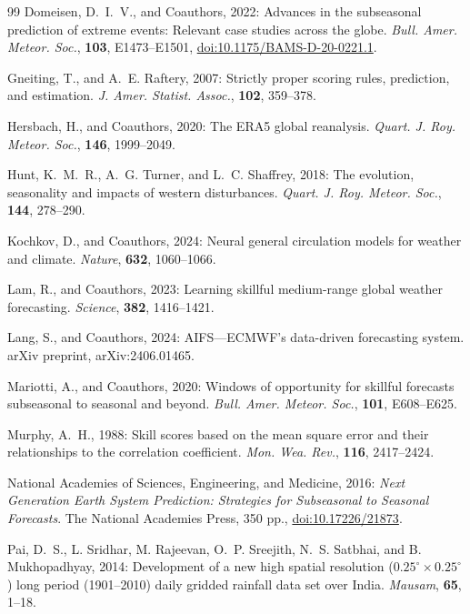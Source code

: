 \documentclass[11pt]{article}
\providecommand{\doi}[1]{\href{https://doi.org/#1}{doi:#1}}
\begin{document}
\begin{thebibliography}{99}
Domeisen, D.~I.~V., and Coauthors, 2022: Advances in the subseasonal
prediction of extreme events: Relevant case studies across the globe.
\textit{Bull. Amer. Meteor. Soc.}, \textbf{103}, E1473--E1501,
\doi{10.1175/BAMS-D-20-0221.1}.

Gneiting, T., and A.~E. Raftery, 2007: Strictly proper scoring rules,
prediction, and estimation. \textit{J. Amer. Statist. Assoc.},
\textbf{102}, 359--378.

Hersbach, H., and Coauthors, 2020: The ERA5 global reanalysis.
\textit{Quart. J. Roy. Meteor. Soc.}, \textbf{146}, 1999--2049.

Hunt, K.~M.~R., A.~G. Turner, and L.~C. Shaffrey, 2018: The evolution,
seasonality and impacts of western disturbances. \textit{Quart. J.
Roy. Meteor. Soc.}, \textbf{144}, 278--290.

Kochkov, D., and Coauthors, 2024: Neural general circulation models
for weather and climate. \textit{Nature}, \textbf{632}, 1060--1066.

Lam, R., and Coauthors, 2023: Learning skillful medium-range global
weather forecasting. \textit{Science}, \textbf{382}, 1416--1421.

Lang, S., and Coauthors, 2024: AIFS---ECMWF's data-driven forecasting
system. arXiv preprint, arXiv:2406.01465.

Mariotti, A., and Coauthors, 2020: Windows of opportunity for skillful
forecasts subseasonal to seasonal and beyond. \textit{Bull. Amer.
Meteor. Soc.}, \textbf{101}, E608--E625.

Murphy, A.~H., 1988: Skill scores based on the mean square error and
their relationships to the correlation coefficient. \textit{Mon. Wea.
Rev.}, \textbf{116}, 2417--2424.

National Academies of Sciences, Engineering, and Medicine, 2016:
\textit{Next Generation Earth System Prediction: Strategies for
Subseasonal to Seasonal Forecasts}. The National Academies Press,
350 pp., \doi{10.17226/21873}.

Pai, D.~S., L. Sridhar, M. Rajeevan, O.~P. Sreejith, N.~S. Satbhai,
and B. Mukhopadhyay, 2014: Development of a new high spatial
resolution ($0.25^{\circ} \times 0.25^{\circ}$) long period
(1901--2010) daily gridded rainfall data set over India.
\textit{Mausam}, \textbf{65}, 1--18.


\end{thebibliography}
\end{document}
